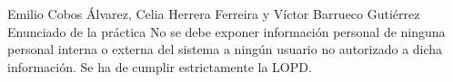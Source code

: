 {Emilio Cobos Álvarez, Celia Herrera Ferreira y Víctor Barrueco Gutiérrez}
{Enunciado de la práctica}
{}
{}
{No se debe exponer información personal de ninguna personal interna o externa del sistema a ningún usuario no autorizado a dicha información. Se ha de cumplir estrictamente la LOPD.}


